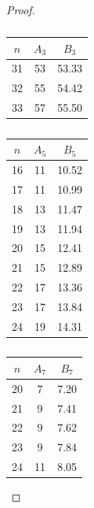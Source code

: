 \begin{proof}
  \begin{table}
    \begin{center}
      \renewcommand{\arraystretch}{1.1}
      \begin{tabular}{|c||c|c|}\hline
        $n$ & $A_3$ & $B_3$ \\\hline\hline
        31 & 53 & 53.33 \\\hline
        32 & 55 & 54.42 \\\hline
        33 & 57 & 55.50 \\\hline
      \end{tabular}
      \hspace{0.5cm}
      \begin{tabular}{|c||c|c|}\hline
        $n$ & $A_5$ & $B_5$  \\\hline\hline
          16 &   11 & 10.52  \\\hline
          17 &   11 & 10.99  \\\hline
          18 &   13 & 11.47  \\\hline
          19 &   13 & 11.94  \\\hline
          20 &   15 & 12.41  \\\hline
          21 &   15 & 12.89  \\\hline
          22 &   17 & 13.36  \\\hline
          23 &   17 & 13.84  \\\hline
          24 &   19 & 14.31  \\\hline
      \end{tabular}
      \hspace{0.5cm}
      \begin{tabular}{|c||c|c|}\hline
        $n$ & $A_7$ & $B_7$ \\\hline\hline
        20 &  7 & 7.20 \\\hline
        21 &  9 & 7.41 \\\hline
        22 &  9 & 7.62 \\\hline
        23 &  9 & 7.84 \\\hline
        24 &  11 & 8.05 \\\hline
      \end{tabular}
      \hspace{0.5cm}
      \renewcommand{\arraystretch}{1.0}
        \vspace{0.5cm}
        \caption{}
        \label{tbl:big}
    \end{center}
  \end{table}


\end{proof}

